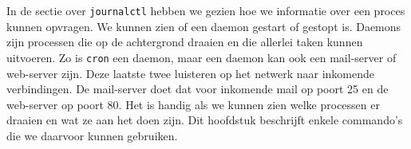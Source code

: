 In de sectie over \texttt{journalctl} hebben we gezien hoe we informatie over een proces kunnen opvragen. We kunnen zien of een daemon gestart of gestopt is. Daemons zijn processen die op de achtergrond draaien en die allerlei taken kunnen uitvoeren. Zo is \texttt{cron} een daemon, maar een daemon kan ook een mail-server of web-server zijn. Deze laatste twee luisteren op het netwerk naar inkomende verbindingen. De mail-server doet dat voor inkomende mail op poort 25 en de web-server op poort 80. Het is handig als we kunnen zien welke processen er draaien en wat ze aan het doen zijn. Dit hoofdstuk beschrijft enkele commando's die we daarvoor kunnen gebruiken.
